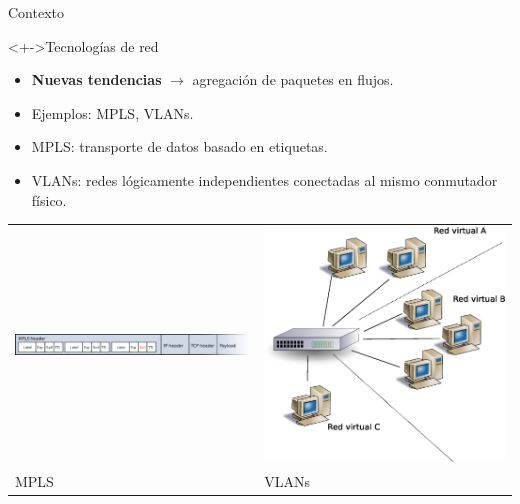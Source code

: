 \documentclass[xcolor=dvipsnames]{beamer}
\begin{document}
\begin{frame}{Contexto}
  \begin{block}<+->{Tecnologías de red}  
    \begin{itemize}
      \scriptsize
      \item {\bf Nuevas tendencias} $\rightarrow$ agregación de paquetes en flujos.
      \item Ejemplos: MPLS, VLANs.
      \item MPLS: transporte de datos basado en etiquetas.
      \item VLANs: redes lógicamente independientes conectadas al mismo conmutador físico. 
    \end{itemize}
  \end{block}
  
     \center 
    \begin{tabularx}{\linewidth}{V|V}

      \includegraphics[scale=0.20]{figures/MPLS_packet.eps}
      &
      \includegraphics[scale=0.20]{figures/vlan.eps}      
      \\
      \tiny MPLS
      &
      \tiny VLANs
      \\
    \end{tabularx}

\end{frame}  
  
\end{document}
